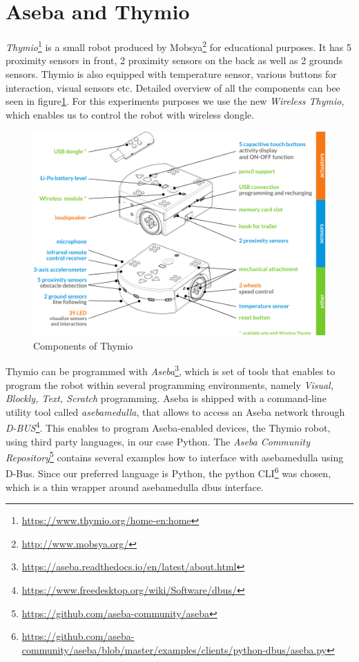\documentclass[format=acmsmall, review=false, screen=true]{acmart}
\begin{document}
\section{Aseba and Thymio}

\emph{Thymio}\footnote{\url{https://www.thymio.org/home-en:home}} is a small robot produced by Mobsya\footnote{\url{http://www.mobsya.org/}} for educational purposes. It has 5 proximity sensors in front, 2 proximity sensors on the back as well as 2 grounds sensors. Thymio is also equipped with temperature sensor, various buttons for interaction, visual sensors etc. Detailed overview of all the components can bee seen in figure\ref{fig:thymio}. For this experiments purposes we use the new \emph{Wireless Thymio}, which enables us to control the robot with wireless dongle.

\begin{figure}[H]
  \includegraphics[width=0.6\linewidth]{img/thymio.PNG}
  \caption{\label{fig:thymio}Components of Thymio}
\end{figure}

Thymio can be programmed with \emph{Aseba}\footnote{\url{https://aseba.readthedocs.io/en/latest/about.html}}, which is set of tools that enables to program the robot within several programming environments, namely \emph{Visual, Blockly, Text, Scratch} programming. Aseba is shipped with a command-line utility tool called \emph{asebamedulla}, that allows to access an Aseba network through \emph{D-BUS}\footnote{\url{https://www.freedesktop.org/wiki/Software/dbus/}}. This enables to program Aseba-enabled devices, the Thymio robot, using third party languages, in our case Python. The \emph{Aseba Community Repository}\footnote{\url{https://github.com/aseba-community/aseba}} contains several examples how to interface with asebamedulla using D-Bus. Since our preferred language is Python, the python CLI\footnote{\url{https://github.com/aseba-community/aseba/blob/master/examples/clients/python-dbus/aseba.py}} was chosen, which is a thin wrapper around asebamedulla dbus interface. 
\end{document}
